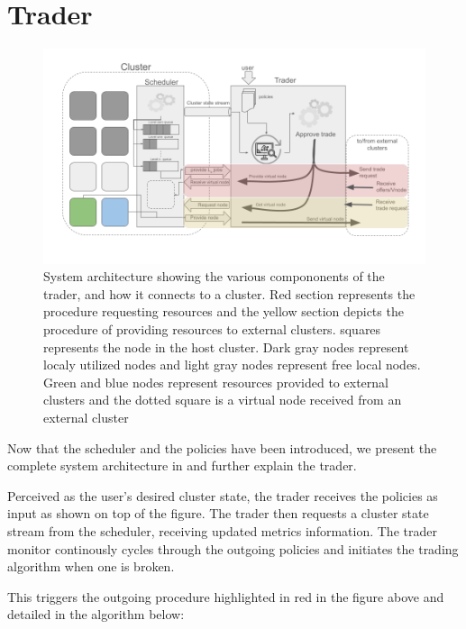 \section{Trader} \label{trader}

\begin{figure}[H]
  \centerline{\includegraphics[scale=0.45]{figures/system-diagram}}
  \caption{System architecture showing the various compononents of the trader,
    and how it connects to a cluster. Red section represents the procedure
    requesting resources and the yellow section depicts the procedure of
    providing resources to external clusters. squares represents the node in
    the host cluster. Dark gray nodes represent localy utilized nodes and light
    gray nodes represent free local nodes. Green and blue nodes represent
    resources    provided to external clusters and the dotted square is a
    virtual node received from an external cluster} 
\end{figure}

Now that the scheduler and the policies have been introduced, we present the
complete system architecture in  and further explain the trader.

Perceived as the user's desired cluster state, the trader receives the policies
as input as shown on top of the figure. The trader then requests a cluster
state stream from the scheduler, receiving updated metrics information. The
trader monitor continously cycles through the outgoing policies and initiates the trading algorithm when one is broken.

This triggers the outgoing procedure highlighted in red in the figure above and
detailed in the algorithm below:

